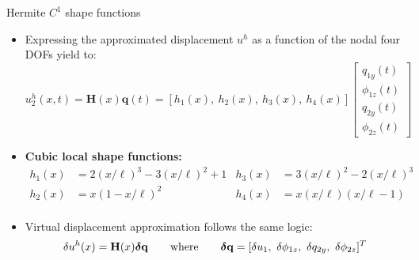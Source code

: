\documentclass[aspectratio=169]{beamer}
\begin{document}
{
\color{white}
\begin{frame}{Hermite $C^1$ shape functions}
  \begin{itemize}
    \item Expressing the approximated displacement $u^h$ as a function of the nodal four DOFs yield to:
          $$u_2^h(x,t)=\mathbf H(x)\mathbf q(t)=[h_1(x),\ h_2(x),\ h_3(x),\ h_4(x)]\begin{bmatrix}
              q_{1y}(t) \\ \phi_{1z}(t)\\ q_{2y}(t)\\ \phi_{2z}(t)
            \end{bmatrix}$$
    \item \textbf{Cubic local shape functions:}
          \begin{align*}
            h_1(x) & =2(x/\ell)^3-3(x/\ell)^2+1 & h_3(x) & =3(x/\ell)^2-2(x/\ell)^3 \\
            h_2(x) & =x(1-x/\ell)^2             & h_4(x) & =x(x/\ell)(x/\ell-1)     \\
          \end{align*}
          \vspace{-1cm}
    \item Virtual displacement approximation follows the same logic:
          $$\delta u^h(x)=\mathbf H(x)\boldsymbol\delta\mathbf q\qquad\text{where}\qquad\boldsymbol\delta\mathbf q=[\delta u_1,\ \delta \phi_{1z},\ \delta q_{2y},\ \delta\phi_{2z}]^T$$
  \end{itemize}
\end{frame}
}
\end{document}
